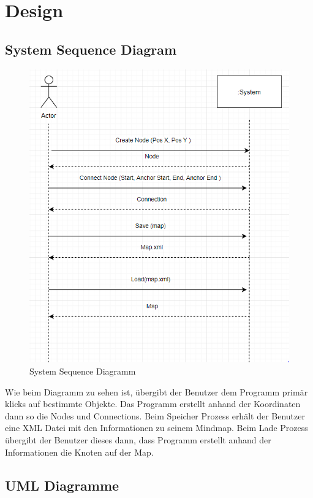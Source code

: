 \chapter{Design}
\label{chap:design}

\section{System Sequence Diagram}
\begin{figure}[H]
	\centering
		\includegraphics[scale=0.7]{images/SSD.png}
	\caption{System Sequence Diagramm}
	\label{fig:domain_model}
\end{figure}
\label{sec:system_sequence_diagram}
Wie beim Diagramm zu sehen ist, übergibt der Benutzer dem Programm
primär klicks auf bestimmte Objekte. Das Programm erstellt anhand der
Koordinaten dann so die Nodes und Connections. Beim Speicher Prozess 
erhält der Benutzer eine XML Datei mit den Informationen zu seinem Mindmap. Beim Lade Prozess übergibt der Benutzer dieses dann, dass Programm erstellt anhand der Informationen die Knoten auf der Map.


\section{UML Diagramme}
\label{sec:uml_diagramme}